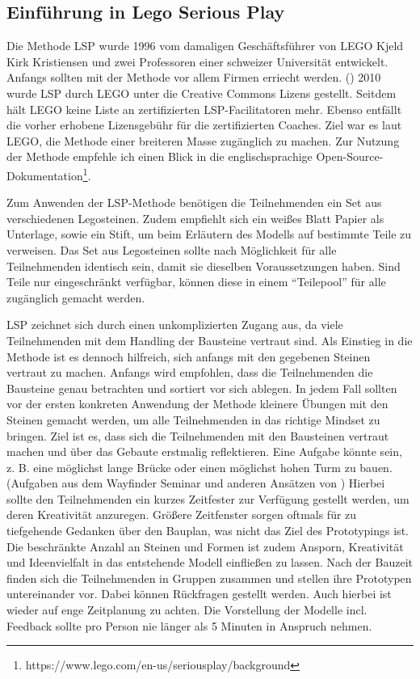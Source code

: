 \pagebreak
\subsection{Einführung in  Lego Serious Play}
\label{intro_LSP}

Die Methode LSP wurde 1996 vom damaligen Geschäftsführer von LEGO\textsuperscript{\textregistered} Kjeld Kirk Kristiensen und zwei Professoren einer schweizer Universität entwickelt. Anfangs sollten mit der Methode vor allem Firmen erriecht werden. (\cite{lsp3D}) 2010 wurde LSP durch LEGO\textsuperscript{\textregistered} unter die Creative Commons Lizens gestellt. Seitdem hält LEGO\textsuperscript{\textregistered} keine Liste an zertifizierten LSP-Facilitatoren mehr. Ebenso entfällt die vorher erhobene Lizensgebühr für die zertifizierten Coaches. Ziel war es laut LEGO\textsuperscript{\textregistered}, die Methode einer breiteren Masse zugänglich zu machen. Zur Nutzung der Methode empfehle ich einen Blick in die englischsprachige Open-Source-Dokumentation\footnote{https://www.lego.com/en-us/seriousplay/background}.

Zum Anwenden der LSP-Methode benötigen die Teilnehmenden ein Set aus verschiedenen Legosteinen. Zudem empfiehlt sich ein weißes Blatt Papier als Unterlage, sowie ein Stift, um beim Erläutern des Modells auf bestimmte Teile zu verweisen. Das Set aus Legosteinen sollte nach Möglichkeit für alle Teilnehmenden identisch sein, damit sie dieselben Voraussetzungen haben. Sind Teile nur eingeschränkt verfügbar, können diese in einem ``Teilepool'' für alle zugänglich gemacht werden.

LSP zeichnet sich durch einen unkomplizierten Zugang aus, da viele Teilnehmenden mit dem Handling der Bausteine vertraut sind. Als Einstieg in die Methode ist es dennoch hilfreich, sich anfangs mit den gegebenen Steinen vertraut zu machen. Anfangs wird empfohlen, dass die Teilnehmenden die Bausteine genau betrachten und sortiert vor sich ablegen. In jedem Fall sollten vor der ersten konkreten Anwendung der Methode kleinere Übungen mit den Steinen gemacht werden, um alle Teilnehmenden in das richtige Mindset zu bringen. Ziel ist es, dass sich die Teilnehmenden mit den Bausteinen vertraut machen und über das Gebaute erstmalig reflektieren. Eine Aufgabe könnte sein, z. B.  eine möglichst lange Brücke oder einen möglichst hohen Turm zu bauen. (Aufgaben aus dem Wayfinder Seminar und anderen Ansätzen von \cite{aufwärmuebungen}) Hierbei sollte den Teilnehmenden ein kurzes Zeitfester zur Verfügung gestellt werden, um deren Kreativität anzuregen. Größere Zeitfenster sorgen oftmals für zu tiefgehende Gedanken über den Bauplan, was nicht das Ziel des Prototypings ist. Die beschränkte Anzahl an Steinen und Formen ist zudem Ansporn, Kreativität und Ideenvielfalt in das entstehende Modell einfließen zu lassen. Nach der Bauzeit finden sich die Teilnehmenden in Gruppen zusammen und stellen ihre Prototypen untereinander vor. Dabei können Rückfragen gestellt werden. Auch hierbei ist wieder auf enge Zeitplanung zu achten. Die Vorstellung der Modelle incl. Feedback sollte pro Person nie länger als 5 Minuten in Anspruch nehmen.

